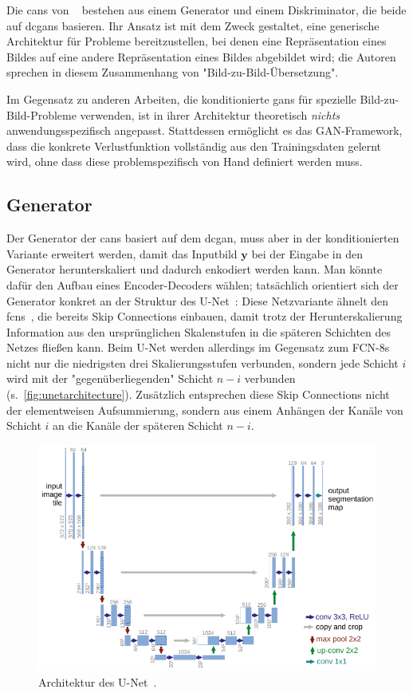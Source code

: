 Die \glspl{can} von \citeauthor{Isola.2017}~\cite{Isola.2017} bestehen aus einem Generator und einem Diskriminator, die beide auf \glspl{dcgan} basieren.
Ihr Ansatz ist mit dem Zweck gestaltet, eine generische Architektur für Probleme bereitzustellen, bei denen eine Repräsentation eines Bildes auf eine andere Repräsentation eines Bildes abgebildet wird; die Autoren sprechen in diesem Zusammenhang von "Bild-zu-Bild-Übersetzung".

Im Gegensatz zu anderen Arbeiten, die konditionierte \glspl{gan} für spezielle Bild-zu-Bild-Probleme verwenden, ist in ihrer Architektur theoretisch \emph{nichts} anwendungsspezifisch angepasst.
Stattdessen ermöglicht es das GAN-Framework, dass die konkrete Verlustfunktion vollständig aus den Trainingsdaten gelernt wird, ohne dass diese problemspezifisch von Hand definiert werden muss.



\subsection{Generator}

Der Generator der \glspl{can} basiert auf dem \gls{dcgan}, muss aber in der konditionierten Variante erweitert werden, damit das Inputbild $ \mathbf{y} $ bei der Eingabe in den Generator herunterskaliert und dadurch enkodiert werden kann.
Man könnte dafür den Aufbau eines Encoder-Decoders wählen; tatsächlich orientiert sich der Generator konkret an der Struktur des U-Net~\cite{Ronneberger.2015}:
Diese Netzvariante ähnelt den \glspl{fcn}~\cite{Long.2015}, die bereits Skip Connections einbauen, damit trotz der Herunterskalierung Information aus den ursprünglichen Skalenstufen in die späteren Schichten des Netzes fließen kann.
Beim U-Net werden allerdings im Gegensatz zum FCN-8s nicht nur die niedrigsten drei Skalierungsstufen verbunden, sondern jede Schicht $ i $ wird mit der "gegenüberliegenden" Schicht $ n-i $ verbunden (s.~\autoref{fig:unetarchitecture}).
Zusätzlich entsprechen diese Skip Connections nicht der elementweisen Aufsummierung, sondern aus einem Anhängen der Kanäle von Schicht $ i $ an die Kanäle der späteren Schicht $ n-i $.

\begin{figure}
	\centering
	\includegraphics[width=0.7\linewidth]{img/unet_architecture}
	\caption{Architektur des U-Net~\cite{Ronneberger.2015}.}
	\label{fig:unetarchitecture}
\end{figure}



